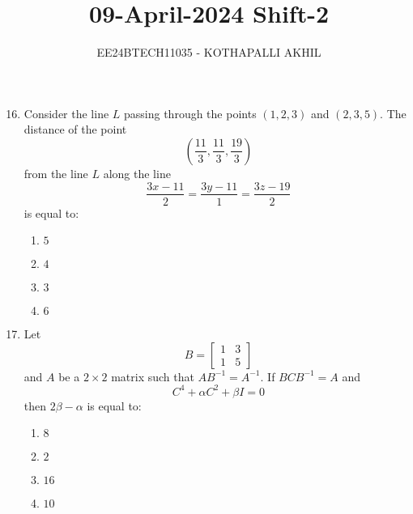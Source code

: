 \documentclass[journal]{IEEEtran}
\numberwithin{figure}{enumi}
\begin{document}


\title{09-April-2024 Shift-2}
\author{EE24BTECH11035 - KOTHAPALLI AKHIL}
{\let\newpage\relax\maketitle}

\begin{enumerate}
\setcounter{enumi}{15}


    \item Consider the line $L$ passing through the points $(1, 2, 3)$ and $(2, 3, 5)$. The distance of the point 
    \begin{equation*}
    \left( \frac{11}{3}, \frac{11}{3}, \frac{19}{3} \right)
    \end{equation*}
    from the line $L$ along the line 
    \begin{equation*}
    \frac{3x - 11}{2} = \frac{3y - 11}{1} = \frac{3z - 19}{2}
    \end{equation*}
    is equal to:
    \begin{enumerate}
        \item $5$
        \item $4$
        \item $3$
        \item $6$
    \end{enumerate}

    \item Let 
    \begin{equation*}
    B = \begin{bmatrix} 1 & 3 \\ 1 & 5 \end{bmatrix}
    \end{equation*}
    and $A$ be a $2 \times 2$ matrix such that $AB^{-1} = A^{-1}$. If $BCB^{-1} = A$ and 
    \begin{equation*}
    C^4 + \alpha C^2 + \beta I = 0
    \end{equation*}
    then $2\beta - \alpha$ is equal to:
    \begin{enumerate}
        \item $8$
        \item $2$
        \item $16$
        \item $10$
    \end{enumerate}


\end{enumerate}
\end{document}
